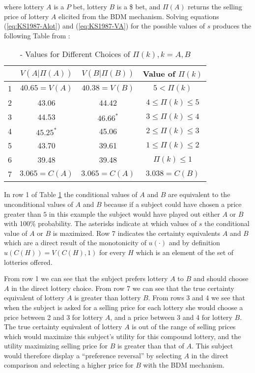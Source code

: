 \documentclass[../main.tex]{subfiles}
\begin{document}
\noindent where lottery $A$ is a $P$ bet, lottery $B$ is a {\$} bet, and $\Pi(A)$ returns the selling price of lottery $A$ elicited from the BDM mechanism.
Solving equations (\ref{eq:KS1987-Alot}) and (\ref{eq:KS1987-VA}) for the possible values of $s$ produces the following Table from \textcite[679]{Karni1987}:
\begin{table}[ht]
	\centering
	\caption{ \textcite{Karni1987} - Values for Different Choices of $\Pi(k),k = A,B$}
	\label{tb:KS1987:Pi}
	\begin{tabular}{cccc}
		   & $V(A|\Pi(A))$  & $V(B|\Pi(B))$  & Value of $\Pi(k)$      \\\hline
		1  & $40.65 = V(A)$ & $40.38 = V(B)$ & $5 < \Pi(k)$           \\
		2  & 43.06          & 44.42          & $4 \leq \Pi(k) \leq 5$ \\
		3  & 44.53          & $46.66^*$      & $3 \leq \Pi(k) \leq 4$ \\
		4  & $45.25^*$      & 45.06          & $2 \leq \Pi(k) \leq 3$ \\
		5  & 43.70          & 39.61          & $1 \leq \Pi(k) \leq 2$ \\
		6  & 39.48          & 39.48          & $\Pi(k) \leq 1$        \\\hline
		7  & $3.065 = C(A)$ & $3.065 = C(A)$ & $3.038 = C(B)$
	\end{tabular}
\end{table}

In row 1 of Table \ref{tb:KS1987:Pi} the conditional values of $A$ and $B$ are equivalent to the unconditional values of $A$ and $B$ because if a subject could have chosen a price greater than $5$ in this example the subject would have played out either $A$ or $B$ with 100\% probability.
The asterisks indicate at which values of $s$ the conditional value of $A$ or $B$ is maximized.
Row 7 indicates the certainty equivalents $A$ and $B$ which are a direct result of the monotonicity of $u(\cdot)$ and by definition $u(C(H)) = V(C(H),1)$ for every $H$ which is an element of the set of lotteries offered. 

From row 1 we can see that the subject prefers lottery $A$ to $B$ and should choose $A$ in the direct lottery choice.
From row 7 we can see that the true certainty equivalent of lottery $A$ is greater than lottery $B$.
From rows 3 and 4 we see that when the subject is asked for a selling price for each lottery she would choose a price between 2 and 3 for lottery $A$, and a price between 3 and 4 for lottery $B$.
The true certainty equivalent of lottery $A$ is out of the range of selling prices which would maximize this subject's utility for this compound lottery, and the utility maximizing selling price for $B$ is greater than that of $A$.
This subject would therefore display a \enquote{preference reversal} by selecting $A$ in the direct comparison and selecting a higher price for $B$ with the BDM mechanism.
\end{document}
